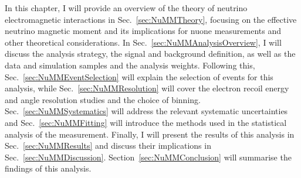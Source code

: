 



In this chapter, I will provide an overview of the theory of neutrino electromagnetic interactions in Sec.~\ref{sec:NuMMTheory}, focusing on the effective neutrino magnetic moment and its implications for \gls{nuone} measurements and other theoretical considerations. In Sec.~\ref{sec:NuMMAnalysisOverview}, I will discuss the analysis strategy, the signal and background definition, as well as the data and simulation samples and the analysis weights. Following this, Sec.~\ref{sec:NuMMEventSelection} will explain the selection of events for this analysis, while Sec.~\ref{sec:NuMMResolution} will cover the electron recoil energy and angle resolution studies and the choice of binning. Sec.~\ref{sec:NuMMSystematics} will address the relevant systematic uncertainties and Sec.~\ref{sec:NuMMFitting} will introduce the methods used in the statistical analysis of the measurement. Finally, I will present the results of this analysis in Sec.~\ref{sec:NuMMResults} and discuss their implications in Sec.~\ref{sec:NuMMDiscussion}. Section~\ref{sec:NuMMConclusion} will summarise the findings of this analysis.

